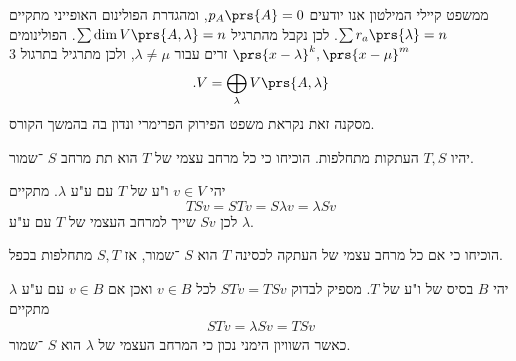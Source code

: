\documentclass[article, 10pt,oneside]{article}
\begin{document}
\begin{remark}
ממשפט קיילי המילטון אנו יודעים
$p_A\prs{A} = 0$,
ומהגדרת הפולינום האופייני מתקיים
$\sum r_a\prs{\lambda} = n$.
לכן נקבל מהתרגיל
$\sum \dim V\prs{A, \lambda} = n$.
הפולינומים
$\prs{x - \lambda}^k, \prs{x-\mu}^m$
זרים עבור
$\lambda \neq \mu$,
ולכן מתרגיל בתרגול 3
\[\text{.} V = \bigoplus_{\lambda} V\prs{A, \lambda}\]
מסקנה זאת נקראת משפט הפירוק הפרימרי ונדון בה בהמשך הקורס.
\end{remark}

\begin{exercise}
יהיו
$T,S$
העתקות מתחלפות. הוכיחו כי כל מרחב עצמי של
$T$
הוא תת מרחב
$S$%
־שמור.
\end{exercise}

\begin{solution}
יהי
$v \in V$
ו"ע של
$T$
עם ע"ע
$\lambda$.
מתקיים
\[T S v = S T v = S \lambda v = \lambda S v \]
לכן
$S v$
שייך למרחב העצמי של
$T$
עם ע"ע
$\lambda$.
\end{solution}

\begin{exercise}
הוכיחו כי אם כל מרחב עצמי של העתקה לכסינה
$T$
הוא
$S$%
־שמור, אז
$S,T$
מתחלפות בכפל.
\end{exercise}

\begin{solution}
יהי
$B$
בסיס של ו"ע של
$T$.
מספיק לבדוק
$ST v = TS v$
לכל
$v \in B$
ואכן
אם
$v \in B$
עם ע"ע
$\lambda$
מתקיים
\begin{align*}
STv = \lambda Sv = TSv
\end{align*}
כאשר השוויון הימני נכון כי המרחב העצמי של
$\lambda$
הוא
$S$%
־שמור.
\end{solution}
\end{document}
